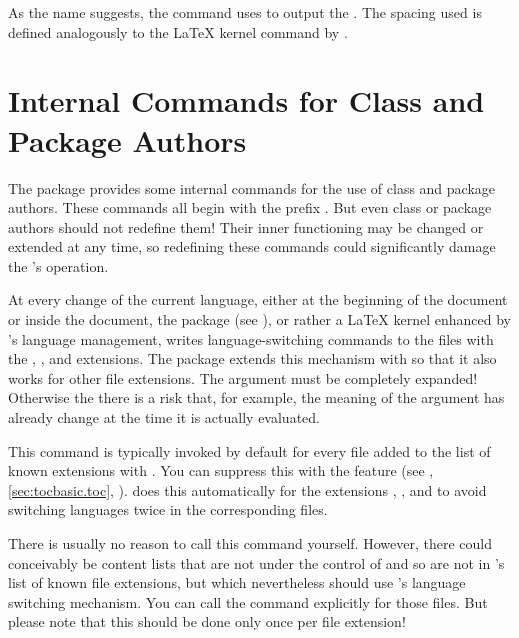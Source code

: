 As the name suggests, the command uses  to output the
. The spacing used is defined analogously to the \LaTeX{} kernel
command  by
.%
\EndIndexGroup
\EndIndexGroup


\section{Internal Commands for Class and Package Authors}

The  package provides some internal commands for the use of
class and package authors. These commands all begin with the prefix
. But even class or package authors
should not redefine them! Their inner functioning may be changed or extended
at any time, so redefining these commands could significantly damage the
's operation.

\begin{Declaration}
\end{Declaration}
At every change of the current language, either at the beginning of the
document or inside the document, the 
package (see \cite{package:babel}), or rather a \LaTeX{} kernel enhanced by
's language management, writes language-switching commands to
the files with the , , and  extensions. The
 package extends this mechanism with
 so that it also works for other file extensions.
The  argument must be completely expanded! Otherwise the
there is a risk that, for example, the meaning of the argument has already
change at the time it is actually evaluated.

This command is typically invoked by default for every file 
added to the list of known extensions with
. You can suppress this with the
 feature (see
, \autoref{sec:tocbasic.toc},
).  does this
automatically for the extensions , , and  to
avoid switching languages twice in the corresponding files.

There is usually no reason to call this command yourself. However, there could
conceivably be content lists that are not under the control of
 and so are not in 's list of known file
extensions, but which nevertheless should use 's language
switching mechanism. You can call the command explicitly for those files.
But please note that this should be done only once per
file extension!%
\EndIndexGroup


